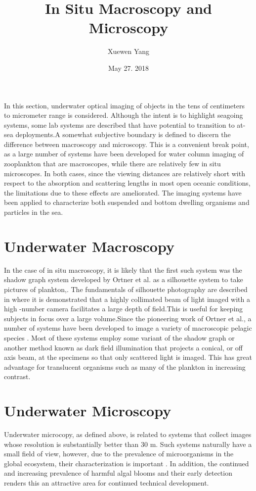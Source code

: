 \documentclass[twocolumn]{article}
\author{Xuewen Yang}
\date{May 27. 2018}
\title{In Situ Macroscopy and Microscopy}
\begin{document}
\maketitle
\large
In this section, underwater optical imaging of objects in the tens of centimeters to micrometer range is considered. Although the intent is to highlight seagoing systems, some lab systems are described that have potential to transition to at-sea deployments.A somewhat subjective boundary is defined to discern the difference between macroscopy and microscopy. This is a convenient break point, as a large number of systems have been developed for water column imaging of zooplankton that are macroscopes, while there are relatively few in situ microscopes. In both cases, since the viewing distances are relatively short with respect to the absorption and scattering lengths in most open oceanic conditions, the limitations due to these effects are ameliorated. The imaging systems have been applied to characterize both suspended and bottom dwelling organisms and particles in the sea.
\section{Underwater Macroscopy}
In the case of in situ macroscopy, it is likely that the first such system was the shadow graph system developed by Ortner et al. as a silhouette system to take pictures of plankton\cite{Ortner1979Silhouette},\cite{Ortner1981In}. The fundamentals of silhouette photography are described in  where it is demonstrated that a highly collimated beam of light imaged with a high -number camera facilitates a large depth of field.This is useful for keeping subjects in focus over a large volume.Since the pioneering work of Ortner et al., a number of systems have been developed to image a variety of macroscopic pelagic species \cite{Settles2001Schlieren}. Most of these systems employ some variant of the shadow graph or another method known as dark field illumination that projects a conical, or off axis beam, at the specimens so that only scattered light is imaged. This has great advantage for translucent organisms such as many of the plankton in increasing contrast.
\section{Underwater Microscopy}
Underwater microcopy, as defined above, is related to systems that collect images whose resolution is substantially better than 30 m. Such systems naturally
have a small field of view, however, due to the prevalence of microorganisms in the global ecosystem, their characterization is important \cite{Delong2009The}. In addition, the continued and increasing prevalence of harmful algal blooms \cite{Anderson2002Harmful} and their early detection renders this an attractive area for continued technical development.
\end{document}
